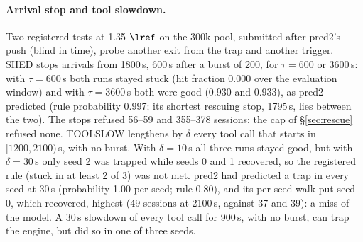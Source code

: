 \paragraph{Arrival stop and tool slowdown.} Two registered tests at 1.35 $\lref$ on the 300k pool, submitted after pred2's push (blind in time), probe another exit from the trap and another trigger. SHED stops arrivals from 1800\,s, 600\,s after a burst of 200, for $\tau=600$ or 3600\,s: with $\tau=600$\,s both runs stayed stuck (hit fraction 0.000 over the evaluation window) and with $\tau=3600$\,s both were good (0.930 and 0.933), as pred2 predicted (rule probability 0.997; its shortest rescuing stop, 1795\,s, lies between the two). The stops refused 56--59 and 355--378 sessions; the cap of \S\ref{sec:rescue} refused none. TOOLSLOW lengthens by $\delta$ every tool call that starts in $[1200,2100)$\,s, with no burst. With $\delta=10$\,s all three runs stayed good, but with $\delta=30$\,s only seed 2 was trapped while seeds 0 and 1 recovered, so the registered rule (stuck in at least 2 of 3) was not met. pred2 had predicted a trap in every seed at 30\,s (probability 1.00 per seed; rule 0.80), and its per-seed walk put seed 0, which recovered, highest (49 sessions at 2100\,s, against 37 and 39): a miss of the model. A 30\,s slowdown of every tool call for 900\,s, with no burst, can trap the engine, but did so in one of three seeds.

